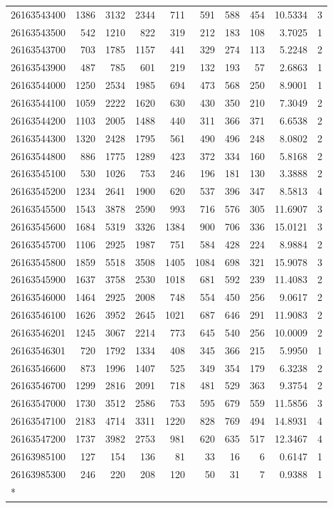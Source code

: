 \documentclass[
  11pt,
]{article}
\begin{document}
\begin{longtable}[t]{lrrrrrrrrr}
26163543400 & 1386 & 3132 & 2344 & 711 & 591 & 588 & 454 & 10.5334 & 3\\
26163543500 & 542 & 1210 & 822 & 319 & 212 & 183 & 108 & 3.7025 & 1\\
26163543700 & 703 & 1785 & 1157 & 441 & 329 & 274 & 113 & 5.2248 & 2\\
26163543900 & 487 & 785 & 601 & 219 & 132 & 193 & 57 & 2.6863 & 1\\
26163544000 & 1250 & 2534 & 1985 & 694 & 473 & 568 & 250 & 8.9001 & 1\\
26163544100 & 1059 & 2222 & 1620 & 630 & 430 & 350 & 210 & 7.3049 & 2\\
26163544200 & 1103 & 2005 & 1488 & 440 & 311 & 366 & 371 & 6.6538 & 2\\
26163544300 & 1320 & 2428 & 1795 & 561 & 490 & 496 & 248 & 8.0802 & 2\\
26163544800 & 886 & 1775 & 1289 & 423 & 372 & 334 & 160 & 5.8168 & 2\\
26163545100 & 530 & 1026 & 753 & 246 & 196 & 181 & 130 & 3.3888 & 2\\
26163545200 & 1234 & 2641 & 1900 & 620 & 537 & 396 & 347 & 8.5813 & 4\\
26163545500 & 1543 & 3878 & 2590 & 993 & 716 & 576 & 305 & 11.6907 & 3\\
26163545600 & 1684 & 5319 & 3326 & 1384 & 900 & 706 & 336 & 15.0121 & 3\\
26163545700 & 1106 & 2925 & 1987 & 751 & 584 & 428 & 224 & 8.9884 & 2\\
26163545800 & 1859 & 5518 & 3508 & 1405 & 1084 & 698 & 321 & 15.9078 & 3\\
26163545900 & 1637 & 3758 & 2530 & 1018 & 681 & 592 & 239 & 11.4083 & 2\\
26163546000 & 1464 & 2925 & 2008 & 748 & 554 & 450 & 256 & 9.0617 & 2\\
26163546100 & 1626 & 3952 & 2645 & 1021 & 687 & 646 & 291 & 11.9083 & 2\\
26163546201 & 1245 & 3067 & 2214 & 773 & 645 & 540 & 256 & 10.0009 & 2\\
26163546301 & 720 & 1792 & 1334 & 408 & 345 & 366 & 215 & 5.9950 & 1\\
26163546600 & 873 & 1996 & 1407 & 525 & 349 & 354 & 179 & 6.3238 & 2\\
26163546700 & 1299 & 2816 & 2091 & 718 & 481 & 529 & 363 & 9.3754 & 2\\
26163547000 & 1730 & 3512 & 2586 & 753 & 595 & 679 & 559 & 11.5856 & 3\\
26163547100 & 2183 & 4714 & 3311 & 1220 & 828 & 769 & 494 & 14.8931 & 4\\
26163547200 & 1737 & 3982 & 2753 & 981 & 620 & 635 & 517 & 12.3467 & 4\\
26163985100 & 127 & 154 & 136 & 81 & 33 & 16 & 6 & 0.6147 & 1\\
26163985300 & 246 & 220 & 208 & 120 & 50 & 31 & 7 & 0.9388 & 1\\*
\end{longtable}
\endgroup{}
\end{document}
